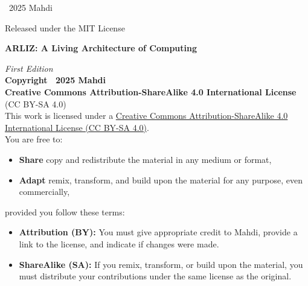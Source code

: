 \documentclass[12pt, oneside, openany]{book}
\begin{document}
\begin{titlepage}
\begin{center}
		\vspace*{1.5cm}
		
		{\small
			\textcopyright\ 2025 Mahdi  
			\par
			Released under the MIT License
		}
	\end{center}
\end{titlepage}

\thispagestyle{empty}
\begin{center}
    \newpage    
	 {\footnotesize
		\textbf{ARLIZ: A Living Architecture of Computing}\\
		\vspace{0.5em}
		\textit{First Edition}\\
		\vspace{1.5em}
		\textbf{Copyright \textcopyright\ 2025 Mahdi}\\
		\vspace{1em}
		\textbf{Creative Commons Attribution-ShareAlike 4.0 International License}\\
		(CC BY-SA 4.0)\\
		\vspace{1.5em}
		This work is licensed under a \href{https://creativecommons.org/licenses/by-sa/4.0/}{Creative Commons Attribution-ShareAlike 4.0 International License (CC BY-SA 4.0)}.\\
		You are free to:\newline
		\begin{itemize}\itemsep0pt
			\item \textbf{Share} \— copy and redistribute the material in any medium or format,\newline
			\item \textbf{Adapt} \— remix, transform, and build upon the material for any purpose, even commercially,
		\end{itemize}
		provided you follow these terms:\newline
		\begin{itemize}\itemsep0pt
			\item \textbf{Attribution (BY):} You must give appropriate credit to Mahdi, provide a link to the license, and indicate if changes were made.\\
			\item \textbf{ShareAlike (SA):} If you remix, transform, or build upon the material, you must distribute your contributions under the same license as the original.

\end{itemize}}
\end{center}
\end{document}
